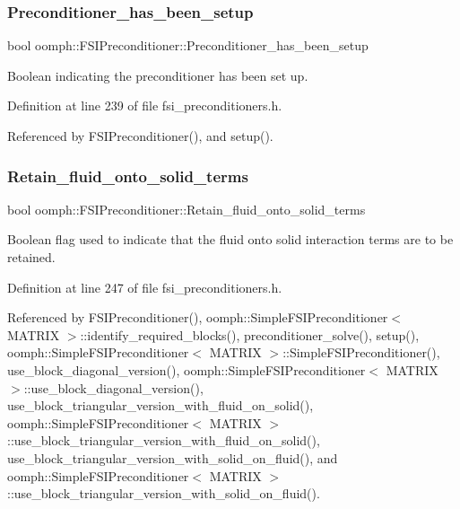 \subsubsection{\texorpdfstring{Preconditioner\+\_\+has\+\_\+been\+\_\+setup}{Preconditioner\_has\_been\_setup}}
{\footnotesize\ttfamily bool oomph\+::\+F\+S\+I\+Preconditioner\+::\+Preconditioner\+\_\+has\+\_\+been\+\_\+setup\hspace{0.3cm}{\ttfamily [private]}}



Boolean indicating the preconditioner has been set up. 



Definition at line 239 of file fsi\+\_\+preconditioners.\+h.



Referenced by F\+S\+I\+Preconditioner(), and setup().

\mbox{\label{classoomph_1_1FSIPreconditioner_ada9ff0aa8a1b15dea196a6d753ec740e}} 
\subsubsection{\texorpdfstring{Retain\+\_\+fluid\+\_\+onto\+\_\+solid\+\_\+terms}{Retain\_fluid\_onto\_solid\_terms}}
{\footnotesize\ttfamily bool oomph\+::\+F\+S\+I\+Preconditioner\+::\+Retain\+\_\+fluid\+\_\+onto\+\_\+solid\+\_\+terms\hspace{0.3cm}{\ttfamily [private]}}



Boolean flag used to indicate that the fluid onto solid interaction terms are to be retained. 



Definition at line 247 of file fsi\+\_\+preconditioners.\+h.



Referenced by F\+S\+I\+Preconditioner(), oomph\+::\+Simple\+F\+S\+I\+Preconditioner$<$ M\+A\+T\+R\+I\+X $>$\+::identify\+\_\+required\+\_\+blocks(), preconditioner\+\_\+solve(), setup(), oomph\+::\+Simple\+F\+S\+I\+Preconditioner$<$ M\+A\+T\+R\+I\+X $>$\+::\+Simple\+F\+S\+I\+Preconditioner(), use\+\_\+block\+\_\+diagonal\+\_\+version(), oomph\+::\+Simple\+F\+S\+I\+Preconditioner$<$ M\+A\+T\+R\+I\+X $>$\+::use\+\_\+block\+\_\+diagonal\+\_\+version(), use\+\_\+block\+\_\+triangular\+\_\+version\+\_\+with\+\_\+fluid\+\_\+on\+\_\+solid(), oomph\+::\+Simple\+F\+S\+I\+Preconditioner$<$ M\+A\+T\+R\+I\+X $>$\+::use\+\_\+block\+\_\+triangular\+\_\+version\+\_\+with\+\_\+fluid\+\_\+on\+\_\+solid(), use\+\_\+block\+\_\+triangular\+\_\+version\+\_\+with\+\_\+solid\+\_\+on\+\_\+fluid(), and oomph\+::\+Simple\+F\+S\+I\+Preconditioner$<$ M\+A\+T\+R\+I\+X $>$\+::use\+\_\+block\+\_\+triangular\+\_\+version\+\_\+with\+\_\+solid\+\_\+on\+\_\+fluid().


